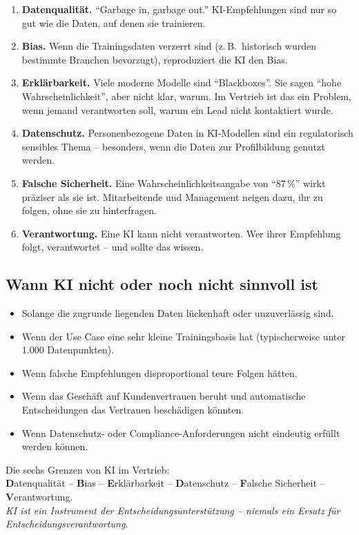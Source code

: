 \documentclass[11pt,a4paper,oneside]{article}
\newcommand{\caveatfontfallback}{\itshape}
\newcommand\caveatfont{\caveatfontfallback}%
\newcommand{\akzent}[1]{{\caveatfont\color{lpAmber}#1}}
\newcommand{\fachbegriff}[1]{\textbf{#1}}
\begin{document}
\begin{enumerate}
  \item \fachbegriff{Datenqualität.} ``Garbage in, garbage out.'' KI-Empfehlungen sind nur so gut wie die Daten, auf denen sie trainieren.
  \item \fachbegriff{Bias.} Wenn die Trainingsdaten verzerrt sind (z.\,B.\ historisch wurden bestimmte Branchen bevorzugt), reproduziert die KI den Bias.
  \item \fachbegriff{Erklärbarkeit.} Viele moderne Modelle sind ``Blackboxes''. Sie sagen ``hohe Wahrscheinlichkeit'', aber nicht klar, warum. Im Vertrieb ist das ein Problem, wenn jemand verantworten soll, warum ein Lead nicht kontaktiert wurde.
  \item \fachbegriff{Datenschutz.} Personenbezogene Daten in KI-Modellen sind ein regulatorisch sensibles Thema -- besonders, wenn die Daten zur Profilbildung genutzt werden.
  \item \fachbegriff{Falsche Sicherheit.} Eine Wahrscheinlichkeitsangabe von ``87\,\%'' wirkt präziser als sie ist. Mitarbeitende und Management neigen dazu, ihr zu folgen, ohne sie zu hinterfragen.
  \item \fachbegriff{Verantwortung.} Eine KI kann nicht verantworten. Wer ihrer Empfehlung folgt, verantwortet -- und sollte das wissen.
\end{enumerate}

\subsection{Wann KI nicht oder noch nicht sinnvoll ist}

\begin{itemize}
  \item Solange die zugrunde liegenden Daten lückenhaft oder unzuverlässig sind.
  \item Wenn der Use Case eine sehr kleine Trainingsbasis hat (typischerweise unter 1.000 Datenpunkten).
  \item Wenn falsche Empfehlungen disproportional teure Folgen hätten.
  \item Wenn das Geschäft auf Kundenvertrauen beruht und automatische Entscheidungen das Vertrauen beschädigen könnten.
  \item Wenn Datenschutz- oder Compliance-Anforderungen nicht eindeutig erfüllt werden können.
\end{itemize}

\begin{eselsbox}[Eselsbrücke: \akzent{D-B-E-D-F-V}]
Die sechs Grenzen von KI im Vertrieb:\\[2pt]
\textbf{D}atenqualität -- \textbf{B}ias -- \textbf{E}rklärbarkeit -- \textbf{D}atenschutz -- \textbf{F}alsche Sicherheit -- \textbf{V}erantwortung.\\[2pt]
\emph{KI ist ein Instrument der Entscheidungsunterstützung -- niemals ein Ersatz für Entscheidungsverantwortung.}
\end{eselsbox}
\end{document}
